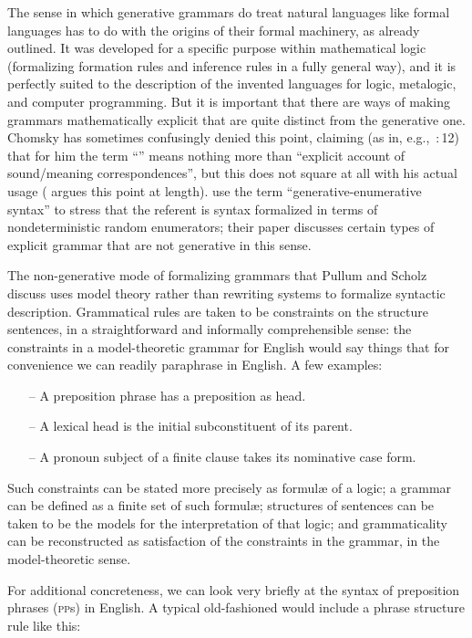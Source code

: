 \documentclass[output=paper]{langscibook}
\begin{document}
The sense in which generative grammars do treat natural languages like formal languages has to do with the origins of their formal machinery, as already outlined.  It was developed for a specific purpose within mathematical logic (formalizing formation rules and inference rules in a fully general way), and it is perfectly suited to the description of the invented languages for logic, metalogic, and computer programming.  But it is important that there are ways of making grammars mathematically explicit that are quite distinct from the generative one.  Chomsky has sometimes confusingly denied this point, claiming (as in, e.g.,\ \citealt{Chomsky66Topics}:\,12) that for him the term ``'' means nothing more than ``explicit account of sound/meaning correspondences'', but this does not square at all with his actual usage (\citealt{Ney93} argues this point at length). \citet{PullScho01LACL} use the term ``generative-enumerative syntax'' to stress that the referent is syntax formalized in terms of nondeterministic random enumerators; their paper discusses certain types of explicit grammar that are not generative in this sense.

The non-generative mode of formalizing grammars that Pullum and Scholz discuss uses model theory rather than rewriting systems to formalize syntactic description. Grammatical rules are taken to be constraints on the structure sentences, in a straightforward and informally comprehensible sense: the constraints in a model-theoretic grammar for English would say things that for convenience we can readily paraphrase in English. A few examples:

\begin{itemize} 
\item[--] A preposition phrase has a preposition as head. 
\item[--] A lexical head is the initial subconstituent of its parent. 
\item[--] A pronoun subject of a finite clause takes its nominative case form. 
\end{itemize} 

Such constraints can be stated more precisely as formul{\ae} of a logic; a grammar can be defined as a finite set of such formul{\ae}; structures of sentences can be taken to be the models for the interpretation of that logic; and grammaticality can be reconstructed as satisfaction of the constraints in the grammar, in the model-theoretic sense.

For additional concreteness, we can look very briefly at the syntax of preposition phrases (\textsc{pp}s) in English.  A typical old-fashioned  would include a phrase structure rule like this:
\end{document}
